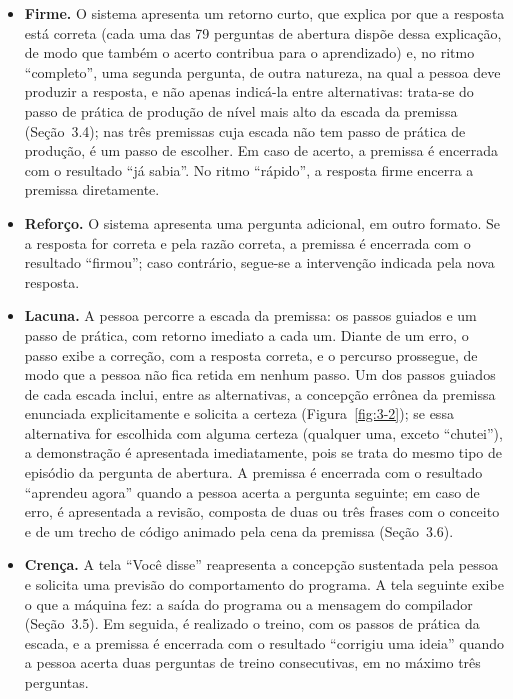 \begin{itemize}
\item \textbf{Firme.} O sistema apresenta um retorno curto, que explica por que a resposta está correta (cada uma das 79 perguntas de abertura dispõe dessa explicação, de modo que também o acerto contribua para o aprendizado) e, no ritmo ``completo'', uma segunda pergunta, de outra natureza, na qual a pessoa deve produzir a resposta, e não apenas indicá-la entre alternativas: trata-se do passo de prática de produção de nível mais alto da escada da premissa (Seção~3.4); nas três premissas cuja escada não tem passo de prática de produção, é um passo de escolher. Em caso de acerto, a premissa é encerrada com o resultado ``já sabia''. No ritmo ``rápido'', a resposta firme encerra a premissa diretamente.
\item \textbf{Reforço.} O sistema apresenta uma pergunta adicional, em outro formato. Se a resposta for correta e pela razão correta, a premissa é encerrada com o resultado ``firmou''; caso contrário, segue-se a intervenção indicada pela nova resposta.
\item \textbf{Lacuna.} A pessoa percorre a escada da premissa: os passos guiados e um passo de prática, com retorno imediato a cada um. Diante de um erro, o passo exibe a correção, com a resposta correta, e o percurso prossegue, de modo que a pessoa não fica retida em nenhum passo. Um dos passos guiados de cada escada inclui, entre as alternativas, a concepção errônea da premissa enunciada explicitamente e solicita a certeza (Figura~\ref{fig:3-2}); se essa alternativa for escolhida com alguma certeza (qualquer uma, exceto ``chutei''), a demonstração é apresentada imediatamente, pois se trata do mesmo tipo de episódio da pergunta de abertura. A premissa é encerrada com o resultado ``aprendeu agora'' quando a pessoa acerta a pergunta seguinte; em caso de erro, é apresentada a revisão, composta de duas ou três frases com o conceito e de um trecho de código animado pela cena da premissa (Seção~3.6).
\item \textbf{Crença.} A tela ``Você disse'' reapresenta a concepção sustentada pela pessoa e solicita uma previsão do comportamento do programa. A tela seguinte exibe o que a máquina fez: a saída do programa ou a mensagem do compilador (Seção~3.5). Em seguida, é realizado o treino, com os passos de prática da escada, e a premissa é encerrada com o resultado ``corrigiu uma ideia'' quando a pessoa acerta duas perguntas de treino consecutivas, em no máximo três perguntas.
\end{itemize}

